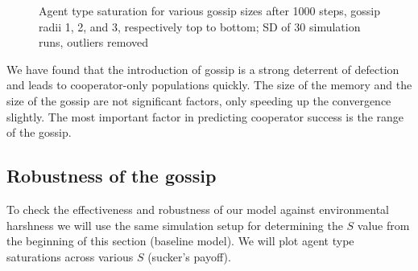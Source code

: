 \documentclass[english]{article}
\begin{document}
\begin{figure}[!h]
  \centering
  \caption{Agent type saturation for various gossip sizes after 1000 steps, gossip radii 1, 2, and 3, respectively top to bottom; SD of 30 simulation runs, outliers removed}
  \label{fig:agent_sat/gossip_size_step1000}
\end{figure}

We have found that the introduction of gossip is a strong deterrent of defection and leads to cooperator-only populations quickly.
The size of the memory and the size of the gossip are not significant factors, only speeding up the convergence slightly.
The most important factor in predicting cooperator success is the range of the gossip.


\subsection{Robustness of the gossip}
To check the effectiveness and robustness of our model against environmental harshness we will
use the same simulation setup for determining the $S$ value from the beginning of this section (baseline model).
We will plot agent type saturations across various $S$ (sucker's payoff).
\end{document}

